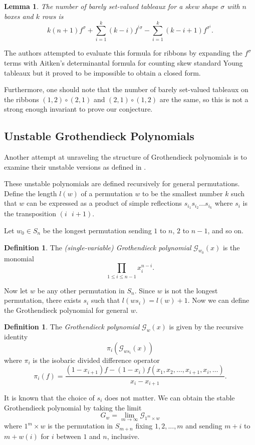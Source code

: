 \documentclass[12pt]{amsart}
\newtheorem{lem}[thm]{Lemma}
\theoremstyle{definition}
\newtheorem{defn}[thm]{Definition}
\begin{document}
\begin{lem} \cite{chan2015bngraph}
The number of barely set-valued tableaux for a skew shape $\sigma$ with $n$ boxes and $k$ rows is 
$$k(n+1)f^{\sigma} + \sum_{i=1}^k (k-i)f^{{}^i\sigma} - \sum_{i=1}^k (k-i+1)f^{\sigma^i}.$$
\end{lem}

The authors attempted to evaluate this formula for ribbons by expanding the $f^{\sigma}$ terms with Aitken's determinantal formula for counting skew standard Young tableaux but it proved to be impossible to obtain a closed form. 

Furthermore, one should note that the number of barely set-valued tableaux on the ribbons $(1,2) \circ (2,1)$ and $(2,1) \circ (1,2)$ are the same, so this is not a strong enough invariant to prove our conjecture. 

\subsection{Unstable Grothendieck Polynomials}

Another attempt at unraveling the structure of Grothendieck polynomials is to examine their unstable versions as defined in \cite{buch2002lrrule}.

These unstable polynomials are defined recursively for general permutations. Define the length $l(w)$ of a permutation $w$ to be the smallest number $k$ such that $w$ can be expressed as a product of simple reflections $s_{i_1}s_{i_2}... s_{i_k}$ where $s_i$ is the transposition $(i\text{ }i+1)$. 

Let $w_0 \in S_n$ be the longest permutation sending $1$ to $n$, $2$ to $n-1$, and so on. 

\begin{defn}
The \textit{(single-variable) Grothendieck polynomial} $\mathcal{G}_{w_0}(x)$ is the monomial
$$\prod_{1 \leq i \leq n-1} x_i^{n-i}.$$
\end{defn}

Now let $w$ be any other permutation in $S_n$. Since $w$ is not the longest permutation, there exists $s_i$ such that $l(ws_i) = l(w) + 1$. Now we can define the Grothendieck polynomial for general $w$. 

\begin{defn}
The \textit{Grothendieck polynomial} $\mathcal{G}_w(x)$ is given by the recursive identity
$$\pi_i(\mathcal{G}_{ws_i}(x))$$
where $\pi_i$ is the isobaric divided difference operator
$$\pi_i(f) = \frac{(1-x_{i+1})f - (1-x_i)f(x_1,x_2,\ldots, x_{i+1}, x_i, \ldots)}{x_i - x_{i+1}}.$$
\end{defn}
It is known that the choice of $s_i$ does not matter. We can obtain the stable Grothendieck polynomial by taking the limit
$$G_w = \lim_{m \to \infty} \mathcal{G}_{1^m \times w}$$
where $1^m \times w$ is the permutation in $S_{m+n}$ fixing $1, 2, ..., m$ and sending $m + i$ to $m + w(i)$ for $i$ between $1$ and $n$, inclusive. 
\end{document}
